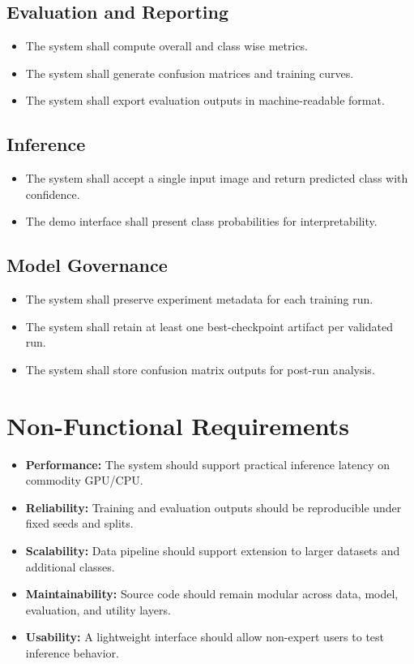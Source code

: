 \subsection{Evaluation and Reporting}
\begin{itemize}
\item The system shall compute overall and class wise metrics.
\item The system shall generate confusion matrices and training curves.
\item The system shall export evaluation outputs in machine-readable format.
\end{itemize}

\subsection{Inference}
\begin{itemize}
\item The system shall accept a single input image and return predicted class with confidence.
\item The demo interface shall present class probabilities for interpretability.
\end{itemize}

\subsection{Model Governance}
\begin{itemize}
\item The system shall preserve experiment metadata for each training run.
\item The system shall retain at least one best-checkpoint artifact per validated run.
\item The system shall store confusion matrix outputs for post-run analysis.
\end{itemize}

\section{Non-Functional Requirements}
\begin{itemize}
\item \textbf{Performance:} The system should support practical inference latency on commodity GPU/CPU.
\item \textbf{Reliability:} Training and evaluation outputs should be reproducible under fixed seeds and splits.
\item \textbf{Scalability:} Data pipeline should support extension to larger datasets and additional classes.
\item \textbf{Maintainability:} Source code should remain modular across data, model, evaluation, and utility layers.
\item \textbf{Usability:} A lightweight interface should allow non-expert users to test inference behavior.
\end{itemize}

